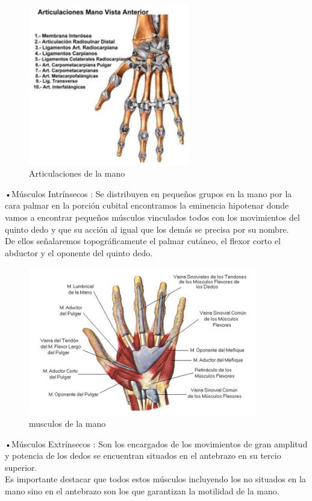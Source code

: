 \documentclass{article}
\begin{document}
\begin{description}
\begin{figure} [htp]%
    \centering
    \includegraphics[width=70mm]{biomecanica4.jpg} %
    \caption{Articulaciones de la mano}
    \label{grafica}
\end{figure}

\item •Músculos Intrínsecos : Se distribuyen en pequeños grupos en la mano por la cara palmar en la porción cubital encontramos la eminencia hipotenar donde vamos a encontrar pequeños músculos vinculados todos con los movimientos del quinto dedo y que su acción al igual que los demás se precisa por su nombre.\\ De ellos señalaremos topográficamente el palmar cutáneo, el flexor corto el abductor y el oponente del quinto dedo.\\

\begin{figure} [htp]%
    \centering
    \includegraphics[width=100mm]{biomecanica5.jpg} %
    \caption{musculos de la mano}
    \label{grafica}
\end{figure}


\item •Músculos Extrínsecos : Son los encargados de los movimientos de gran amplitud y potencia de los dedos se encuentran situados en el antebrazo en su tercio superior.\\ Es importante destacar que todos estos músculos incluyendo los no situados en la mano sino en el antebrazo son los que garantizan la motilidad de la mano.\\
\end{description}
\end{document}
